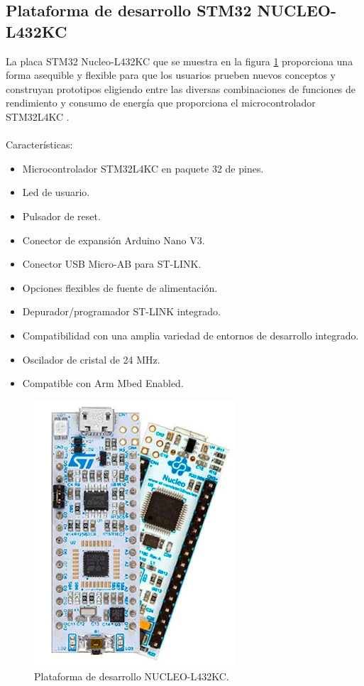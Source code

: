 \subsection{Plataforma de desarrollo STM32 NUCLEO-L432KC}
La placa STM32 Nucleo-L432KC que se muestra en la figura \ref{fig:nucleol432kc} proporciona una forma asequible y flexible para que los usuarios prueben nuevos conceptos y construyan prototipos eligiendo entre las diversas combinaciones de funciones de rendimiento y consumo de energía que proporciona el microcontrolador STM32L4KC \citep{NUCLEOL432KC}.
\\
\\Características:
\begin{itemize}
	\item Microcontrolador STM32L4KC en paquete 32 de pines.
	\item Led de usuario.
	\item Pulsador de reset.
	\item Conector de expansión Arduino Nano V3.
	\item Conector USB Micro-AB para ST-LINK.
	\item Opciones flexibles de fuente de alimentación.
	\item Depurador/programador ST-LINK integrado.
	\item Compatibilidad con una amplia variedad de entornos de desarrollo integrado.
	\item Oscilador de cristal de 24 MHz.
	\item Compatible con Arm Mbed Enabled.  
\end{itemize}
\begin{figure}[htbp]
	\centering
	\includegraphics[width=.3\textwidth]{./Figures/nucleo-l432kc.jpg}
	\caption{Plataforma de desarrollo NUCLEO-L432KC.}
	\label{fig:nucleol432kc}
\end{figure}
\vspace{5cm}

